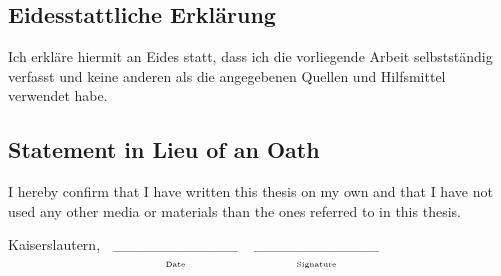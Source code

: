 \documentclass[a4paper]{report}
\begin{document}


% 
% 
% 
  




\pagestyle{empty}

\cleardoublepage

\null

\subsection*{Eidesstattliche Erklärung}

Ich erkläre hiermit an Eides statt, dass ich die vorliegende Arbeit
selbstständig verfasst und keine anderen als die angegebenen Quellen
und Hilfsmittel verwendet habe. 

\subsection*{Statement in Lieu of an Oath }

I hereby confirm that I have written this thesis on my own and that
I have not used any other media or materials than the ones referred
to in this thesis. 

\vspace{2cm}


Kaiserslautern, $\begin{array}[t]{c}
    \text{\_\_\_\_\_\_\_\_\_\_\_\_}\\
    {\scriptscriptstyle \text{Date}}
\end{array}$\hfill{$\begin{array}[t]{c}
    \_\_\_\_\_\_\_\_\_\_\_\_\\
    {\scriptscriptstyle \text{Signature}}
\end{array}$\hfill}
\end{document}
